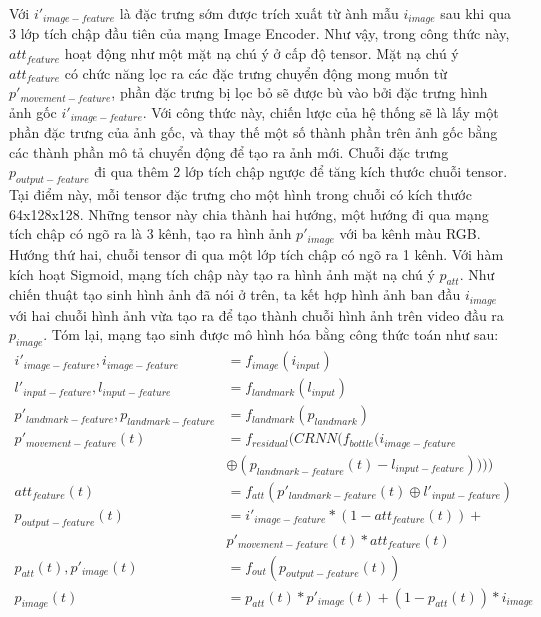 Với $i'_{image-feature}$ là đặc trưng sớm được trích xuất từ ành mẫu $i_{image}$ sau khi qua 3 lớp tích chập đầu tiên của mạng Image Encoder. Như vậy, trong công thức này, $att_{feature}$ hoạt động như một mặt nạ chú ý ở cấp độ tensor. Mặt nạ chú ý $att_{feature}$ có chức năng lọc ra các đặc trưng chuyển động mong muốn từ $p'_{movement-feature}$, phần đặc trưng bị lọc bỏ sẽ được bù vào bởi đặc trưng hình ảnh gốc $i'_{image-feature}$. Với công thức này, chiến lược của hệ thống sẽ là lấy một phần đặc trưng của ảnh gốc, và thay thế một số thành phần trên ảnh gốc bằng các thành phần mô tả chuyển động để tạo ra ảnh mới. Chuỗi đặc trưng $p_{output-feature}$ đi qua thêm 2 lớp tích chập ngược để tăng kích thước chuỗi tensor. Tại điểm này, mỗi tensor đặc trưng cho một hình trong chuỗi có kích thước 64x128x128. Những tensor này chia thành hai hướng, một hướng đi qua mạng tích chập có ngõ ra là 3 kênh, tạo ra hình ảnh $p'_{image}$ với ba kênh màu RGB. Hướng thứ hai, chuỗi tensor đi qua một lớp tích chập có ngõ ra 1 kênh. Với hàm kích hoạt Sigmoid, mạng tích chập này tạo ra hình ảnh mặt nạ chú ý $p_{att}$. Như chiến thuật tạo sinh hình ảnh đã nói ở trên, ta kết hợp hình ảnh ban đầu $i_{image}$ với hai chuỗi hình ảnh vừa tạo ra để tạo thành chuỗi hình ảnh trên video đầu ra $p_{image}$. Tóm lại, mạng tạo sinh được mô hình hóa bằng công thức toán như sau:
\begin{equation}
    \begin{split}
    i'_{image-feature}, i_{image-feature} &= f_{image}(i_{input})\\
    l'_{input-feature}, l_{input-feature} &= f_{landmark}(l_{input})\\
    p'_{landmark-feature}, p_{landmark-feature} &= f_{landmark}(p_{landmark})\\
    p'_{movement-feature}(t) &= f_{residual}(CRNN(f_{bottle}(i_{image-feature} \\
    &\oplus (p_{landmark-feature}(t)-l_{input-feature}))))\\
    att_{feature}(t) &= f_{att}(p'_{landmark-feature}(t) \oplus l'_{input-feature})\\
    p_{output-feature}(t) &= i'_{image-feature}*(1-att_{feature}(t))+\\
    &p'_{movement-feature}(t)*att_{feature}(t)\\
    p_{att}(t), p'_{image}(t) &= f_{out}(p_{output-feature}(t))\\
    p_{image}(t) &= p_{att}(t)*p'_{image}(t)+(1-p_{att}(t))*i_{image}
    \end{split}
\end{equation}

